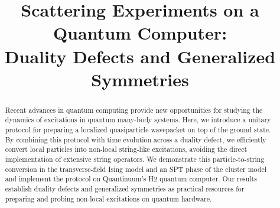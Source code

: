 \documentclass[aps,floatfix,10pt,amssymb,amsfont,amsmath,superscriptaddress,float,nofootinbib,longbibliography,nobalancelastpage,twocolumn]{revtex4-2}
\begin{document}
\title{Scattering Experiments on a Quantum Computer:\\
 Duality Defects and Generalized Symmetries}
\begin{abstract}
Recent advances in quantum computing provide new opportunities for studying the dynamics of excitations in quantum many-body systems. Here, we introduce a unitary protocol for preparing a localized quasiparticle wavepacket on top of the ground state. By combining this protocol with time evolution across a duality defect, we efficiently convert local particles into non-local string-like excitations, avoiding the direct implementation of extensive string operators. We demonstrate this particle-to-string conversion in the transverse-field Ising model and an SPT phase of the cluster model and implement the protocol on Quantinuum's H2 quantum computer. Our results establish duality defects and generalized symmetries as practical resources for preparing and probing non-local excitations on quantum hardware.
\end{abstract}


\maketitle
\end{document}
